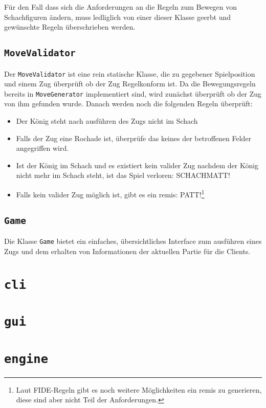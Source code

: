 \documentclass{scrreprt}
\newcommand{\lstinlinejava}[1]{\lstinline[language=java]{#1}}
\newcommand{\lstj}[1]{\lstinlinejava{#1}}
\begin{document}
Für den Fall dass sich die Anforderungen an die Regeln zum Bewegen von Schachfiguren ändern, muss ledliglich von einer dieser Klasse geerbt und gewünschte Regeln überschrieben werden.


\section{\lstj{MoveValidator}}
Der \lstj{MoveValidator} ist eine rein statische Klasse, die zu gegebener Spielposition und einem Zug überprüft ob der Zug Regelkonform ist. Da die Bewegungsregeln bereits in \lstj{MoveGenerator} implementiert sind, wird zunächst überprüft ob der Zug von ihm gefunden wurde. Danach werden noch die folgenden Regeln überprüft:

\begin{itemize}
\item
  Der König steht nach ausführen des Zugs nicht im Schach
  
\item
  Falls der Zug eine Rochade ist, überprüfe das keines der betroffenen Felder angegriffen wird.
  
\item
  Ist der König im Schach und es existiert kein valider Zug nachdem der König nicht mehr im Schach steht, ist das Spiel verloren: SCHACHMATT!
  
\item
  Falls kein valider Zug möglich ist, gibt es ein remis: PATT!\footnote{Laut FIDE-Regeln gibt es noch weitere Möglichkeiten ein remis zu generieren, diese sind aber nicht Teil der Anforderungen.}
\end{itemize}



\section{\lstj{Game}}

Die Klasse \lstj{Game} bietet ein einfaches, übersichtliches Interface zum ausführen eines Zugs und dem erhalten von Informationen der aktuellen Partie für die Clients.




\chapter{\lstj{cli}}


\chapter{\lstj{gui}}


\chapter{\lstj{engine}}
\end{document}
